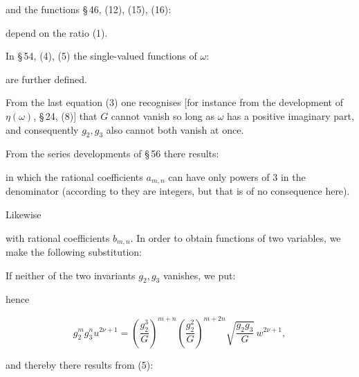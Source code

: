 
and the functions \S\,46, (12), (15), (16):


depend on the ratio (1).

In \S\,54, (4), (5) the single-valued functions of $\omega$:


are further defined.

From the last equation (3) one recognises [for instance from the
development of $\eta(\omega)$, \S\,24, (8)] that $G$ cannot vanish
so long as $\omega$ has a positive imaginary part, and consequently
$g_2, g_3$ also cannot both vanish at once.

From the series developments of \S\,56 there results:


in which the rational coefficients $a_{m,n}$ can have only powers of 3
in the denominator (according to  they are integers,
but that is of no consequence here).

Likewise


with rational coefficients $b_{m,n}$. In order to obtain functions of
two variables, we make the following substitution:

If neither of the two invariants $g_2, g_3$ vanishes, we put:


hence

\[
g_2^m g_3^n u^{2\nu+1} = \left(\frac{g_2^3}{G}\right)^{m+n} \left(\frac{g_2^2}{G}\right)^{m+2n} \sqrt{\frac{g_2 g_3}{G}}\, w^{2\nu+1},
\]

and thereby there results from (5):

